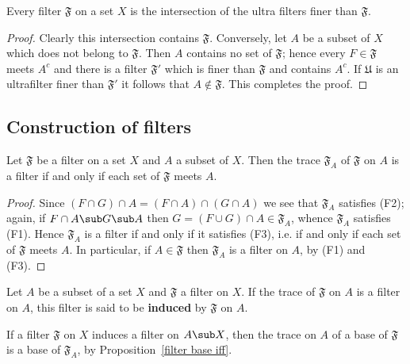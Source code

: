 \begin{proposition}\label{filter is intersection of finer ultrafilter}
Every filter $\mathfrak{F}$ on a set $X$ is the intersection of the ultra filters finer than $\mathfrak{F}$.
\end{proposition}
\begin{proof}
Clearly this intersection contains $\mathfrak{F}$. Conversely, let $A$ be a subset of $X$ which does not belong to $\mathfrak{F}$. Then $A$ contains no set of $\mathfrak{F}$; hence every $F\in\mathfrak{F}$ meets $A^c$ and there is a filter $\mathfrak{F}'$ which is finer than $\mathfrak{F}$ and contains $A^c$. If $\mathfrak{U}$ is an ultrafilter finer than $\mathfrak{F}'$ it follows that $A\notin\mathfrak{F}$. This completes the proof.
\end{proof}
\subsection{Construction of filters}
\begin{proposition}\label{filter trace is filter iff}
Let $\mathfrak{F}$ be a filter on a set $X$ and $A$ a subset of $X$. Then the trace $\mathfrak{F}_A$ of $\mathfrak{F}$ on $A$ is a filter if and only if each set of $\mathfrak{F}$ meets $A$.
\end{proposition}
\begin{proof}
Since $(F\cap G)\cap A=(F\cap A)\cap (G\cap A)$ we see that $\mathfrak{F}_A$ satisfies (F2); again, if $F\cap A\sub G\sub A$ then $G=(F\cup G)\cap A\in\mathfrak{F}_A$, whence $\mathfrak{F}_A$ satisfies (F1). Hence $\mathfrak{F}_A$ is a filter if and only if it satisfies (F3), i.e. if and only if each set of $\mathfrak{F}$ meets $A$. In particular, if $A\in\mathfrak{F}$ then $\mathfrak{F}_A$ is a filter on $A$, by (F1) and (F3).
\end{proof}
\begin{definition}
Let $A$ be a subset of a set $X$ and $\mathfrak{F}$ a filter on $X$. If the trace of $\mathfrak{F}$ on $A$ is a filter on $A$, this filter is said to be \textbf{induced} by $\mathfrak{F}$ on $A$.
\end{definition}
If a filter $\mathfrak{F}$ on $X$ induces a filter on $A\sub X$, then the trace on $A$ of a base of $\mathfrak{F}$ is a base of $\mathfrak{F}_A$, by Proposition~\ref{filter base iff}.
